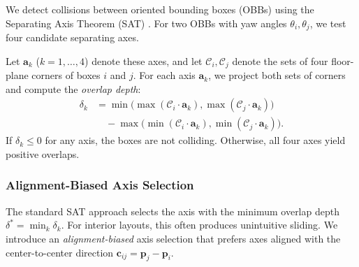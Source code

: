 We detect collisions between oriented bounding boxes (OBBs) using the Separating Axis Theorem (SAT) \cite{10.1145/237170.237244}. For two OBBs with yaw angles $\theta_i, \theta_j$, we test four candidate separating axes. 

Let $\mathbf{a}_k$ ($k = 1, \ldots, 4$) denote these axes, and let $\mathcal{C}_i, \mathcal{C}_j$ denote the sets of four floor-plane corners of boxes $i$ and $j$. For each axis $\mathbf{a}_k$, we project both sets of corners and compute the \emph{overlap depth}:
\begin{equation}
\begin{split}
\delta_k &= \min\!\big(\max(\mathcal{C}_i \cdot \mathbf{a}_k), \max(\mathcal{C}_j \cdot \mathbf{a}_k)\big) \\
&\quad - \max\!\big(\min(\mathcal{C}_i \cdot \mathbf{a}_k), \min(\mathcal{C}_j \cdot \mathbf{a}_k)\big).
\end{split}
\label{eq:sat_overlap}
\end{equation}
If $\delta_k \leq 0$ for any axis, the boxes are not colliding. Otherwise, all four axes yield positive overlaps.

\subsubsection{Alignment-Biased Axis Selection}
\label{sec:method:axis_selection}

The standard SAT approach selects the axis with the minimum overlap depth $\delta^* = \min_k \delta_k$. For interior layouts, this often produces unintuitive sliding. We introduce an \emph{alignment-biased} axis selection that prefers axes aligned with the center-to-center direction $\mathbf{c}_{ij} = \mathbf{p}_j - \mathbf{p}_i$. 

